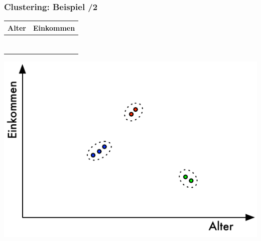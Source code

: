 \begin{frame}[c]
\frametitle{Clustering: Beispiel /2}

\begin{minipage}[c]{3.5cm}
{\small\begin{tabular}{|c|r|}
  \rowcolor{Gray}\hline
Alter & Einkommen \\
\hline
\hline
\color{blue}{25} & \color{blue}{50.000} \\
\color{blue}{27} & \color{blue}{55.000} \\
\color{blue}{26} & \color{blue}{58.000} \\
\color{red}{40} & \color{red}{85.500} \\
\color{red}{42} & \color{red}{90.000} \\
\color{green}{57} & \color{green}{38.000} \\
\color{green}{59} & \color{green}{40.000} \\
\hline
\end{tabular}}
\end{minipage}\quad
\begin{minipage}[c]{6cm}
\includegraphics[scale=.7]{fig1/clustering.pdf}
\end{minipage}

\end{frame}


